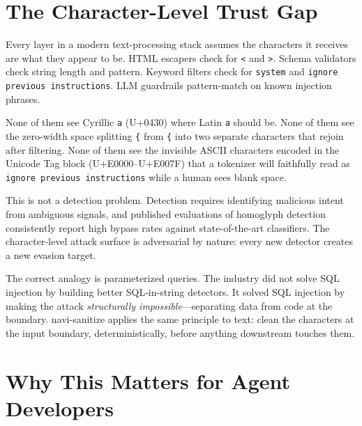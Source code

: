 \documentclass[11pt,letterpaper]{article}
\begin{document}

\section{The Character-Level Trust Gap}

Every layer in a modern text-processing stack assumes the characters it receives are what they appear to be. HTML escapers check for \texttt{<} and \texttt{>}. Schema validators check string length and pattern. Keyword filters check for \texttt{system} and \texttt{ignore previous instructions}. LLM guardrails pattern-match on known injection phrases.

None of them see Cyrillic \texttt{а} (U+0430) where Latin \texttt{a} should be. None of them see the zero-width space splitting \texttt{\{} from \texttt{\{} into two separate characters that rejoin after filtering. None of them see the invisible ASCII characters encoded in the Unicode Tag block (U+E0000--U+E007F) that a tokenizer will faithfully read as \texttt{ignore previous instructions} while a human sees blank space.

This is not a detection problem. Detection requires identifying malicious intent from ambiguous signals, and published evaluations of homoglyph detection consistently report high bypass rates against state-of-the-art classifiers. The character-level attack surface is adversarial by nature: every new detector creates a new evasion target.

The correct analogy is parameterized queries. The industry did not solve SQL injection by building better SQL-in-string detectors. It solved SQL injection by making the attack \emph{structurally impossible}---separating data from code at the boundary. navi-sanitize applies the same principle to text: clean the characters at the input boundary, deterministically, before anything downstream touches them.


\section{Why This Matters for Agent Developers}
\end{document}

